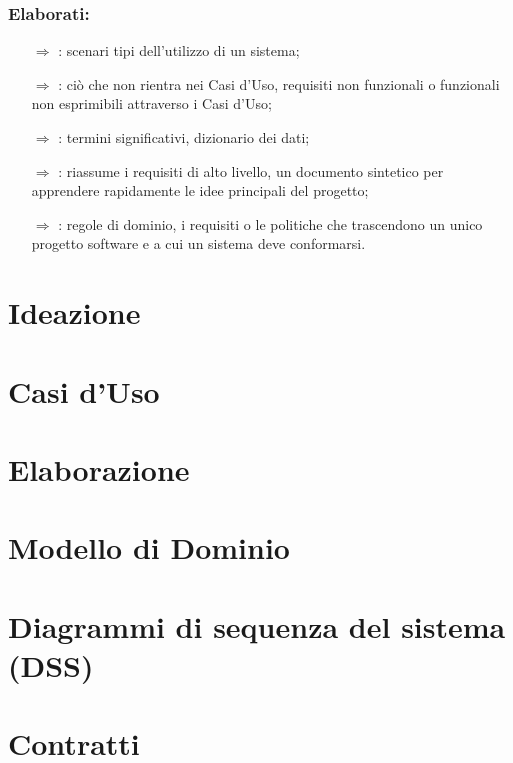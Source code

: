 \subsubsection{Elaborati:}

\begin{itemize}
    \item [$\Rightarrow$] : scenari tipi dell'utilizzo di un sistema;
    \item [$\Rightarrow$] : ciò che non rientra nei Casi d'Uso, requisiti non funzionali o funzionali non esprimibili attraverso i Casi d'Uso;
    \item [$\Rightarrow$] : termini significativi, dizionario dei dati;
    \item [$\Rightarrow$] : riassume i requisiti di alto livello, un documento sintetico per apprendere rapidamente le idee principali del progetto;
    \item [$\Rightarrow$] : regole di dominio, i requisiti o le politiche che trascendono un unico progetto software e a cui un sistema deve conformarsi.
\end{itemize}

\section{Ideazione}

\section{Casi d'Uso}

\section{Elaborazione}

\section{Modello di Dominio}

\section{Diagrammi di sequenza del sistema (DSS)}

\section{Contratti}